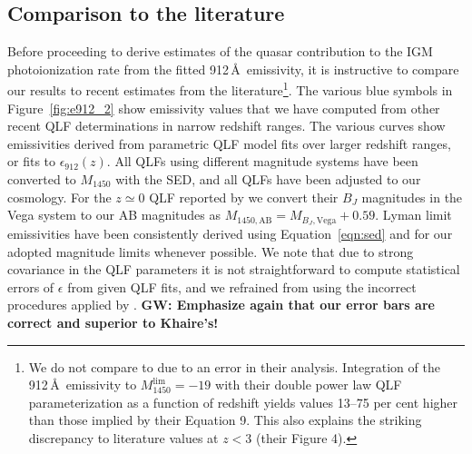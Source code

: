 \documentclass[fleqn,usenatbib]{mnras}
\begin{document}
\subsection{Comparison to the literature}

Before proceeding to derive estimates of the quasar contribution to the IGM  photoionization rate
from the fitted 912\,\AA\ emissivity, it is instructive to compare our results to recent estimates from
the literature\footnote{We do not compare to \citet{2017MNRAS.466.1160M} due to an error in their analysis.
Integration of the 912\,\AA\ emissivity to $M_{1450}^\mathrm{lim}=-19$ with their double power law
QLF parameterization as a function of redshift yields values 13--75 per cent higher than those implied by their Equation 9.
This also explains the striking discrepancy to literature values at $z<3$ (their Figure 4).}.
The various blue symbols in Figure~\ref{fig:e912_2} show emissivity values that we have computed
from other recent QLF determinations in narrow redshift ranges.
The various curves show emissivities derived from parametric QLF model fits over larger redshift ranges,
or fits to $\epsilon_{912}\left(z\right)$. All QLFs using different magnitude systems have been converted to
$M_{1450}$ with the \citet{2015MNRAS.449.4204L} SED,
and all QLFs have been adjusted to our cosmology.
For the $z\simeq 0$ QLF reported by \citet{2009A&A...507..781S} we
convert their $B_J$ magnitudes in the Vega system to our AB magnitudes
as $M_{1450,\mathrm{AB}}=M_{B_J, \mathrm{Vega}}+0.59$.
Lyman limit emissivities have been consistently derived using 
Equation~\eqref{eqn:sed} and for our adopted magnitude limits whenever possible.
We note that due to strong covariance in the QLF parameters
it is not straightforward to compute statistical errors of $\epsilon$ from given QLF fits,
and we refrained from using the incorrect procedures applied by \citet{2015MNRAS.451L..30K}.
\textbf{GW: Emphasize again that our error bars are correct and superior to Khaire's!}
\end{document}
